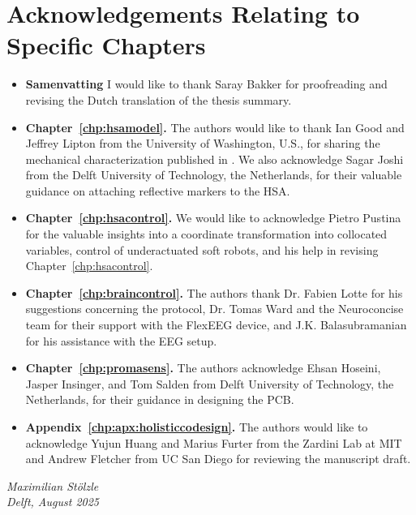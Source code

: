 \section*{Acknowledgements Relating to Specific Chapters}
\vspace{0.3cm}

\begin{itemize}
    \item \textbf{Samenvatting} I would like to thank Saray Bakker for proofreading and revising the Dutch translation of the thesis summary.
    \item \textbf{Chapter~\ref{chp:hsamodel}.} The authors would like to thank Ian Good and Jeffrey Lipton from the University of Washington, U.S., for sharing the mechanical characterization published in \citep{good2022expanding}. We also acknowledge Sagar Joshi from the Delft University of Technology, the Netherlands, for their valuable guidance on attaching reflective markers to the HSA.
    \item \textbf{Chapter~\ref{chp:hsacontrol}.} We would like to acknowledge Pietro Pustina for the valuable insights into a coordinate transformation into collocated variables, control of underactuated soft robots, and his help in revising Chapter~\ref{chp:hsacontrol}.
    \item \textbf{Chapter~\ref{chp:braincontrol}.} The authors thank Dr. Fabien Lotte for his suggestions concerning the protocol, Dr. Tomas Ward and the Neuroconcise team for their support with the FlexEEG device, and J.K. Balasubramanian for his assistance with the EEG setup.
    \item \textbf{Chapter~\ref{chp:promasens}.} The authors acknowledge Ehsan Hoseini, Jasper Insinger, and Tom Salden from Delft University of Technology, the Netherlands, for their guidance in designing the \gls{PCB}.
    \item \textbf{Appendix~\ref{chp:apx:holisticcodesign}.} The authors would like to acknowledge Yujun Huang and Marius Furter from the Zardini Lab at MIT and Andrew Fletcher from UC San Diego for reviewing the manuscript draft.
\end{itemize}

\begin{flushright}
{\makeatletter\itshape
    Maximilian Stölzle \\
    Delft, August 2025
\makeatother}
\end{flushright}


